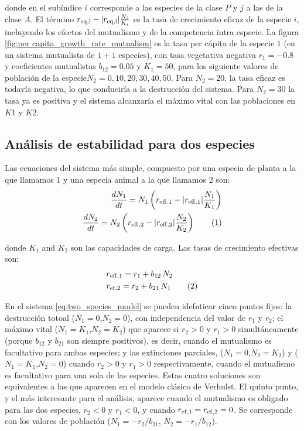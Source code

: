 \noindent donde en el subíndice $i$ corresponde a las especies de la clase $P$ y $j$ a las de la clase $A$. El término $r_{\rm{eq},i} - |r_{\rm{eq},i}| \frac{N_i}{K_i}$ es la tasa de crecimiento eficaz de la especie $i$, incluyendo los efectos del mutualismo y de la competencia intra especie. La figura \ref{fig:per capita_growth_rate_mutualism} es la tasa per cápita de la especie $1$ (en un sistema mutualista de $1+1$ especies),
con tasa vegetativa negativa $r_1=-0.8$ y coeficientes mutualistas $b_{12}=0.05$ y $K_1=50$, para los siguiente valores de población de la especie$N_2=0,10,20,30,40,50$. Para $N_2=20$, la tasa eficaz es todavía negativa, lo que conduciría a la destrucción del sistema. Para
$N_2=30$ la tasa ya es positiva y el sistema alcanzaría el máximo vital con las poblaciones en $K1$ y $K2$.

\subsection{Análisis de estabilidad para dos especies}

Las ecuaciones del sistema más simple, compuesto por una especia de planta a la que llamamos $1$ y una especia animal a la que llamamos $2$ son:
\begin{align*}
\displaystyle \frac{dN_1}{dt}= N_1 \left( r_{\rm{eff},1} - |r_{\rm{eff},1}| \frac{N_1}{K_1} \right) \\
\displaystyle \frac{dN_2}{dt}= N_2 \left( r_{\rm{eff},2} - |r_{\rm{eff},2}| \frac{N_2}{K_2} \right)
\stepcounter{equation}\tag{\theequation}\label{eq:two_species_model}
\end{align*}

\noindent donde $K_1$ and $K_2$ son las capacidades de carga. Las tasas de crecimiento efectivas son:
\begin{align*}
\displaystyle &r_{\rm{eff},1} = r_{1} + b_{12}\, N_2 \\
\displaystyle &r_{\rm{ef},2} = r_{2} + b_{21}\, N_1
\stepcounter{equation}\tag{\theequation}\label{eq:two_species_reff}
\end{align*}

En el sistema \ref{eq:two_species_model} se pueden idefnticar cinco puntos fijos:
la destrucción totoal ($N_1=0$,$N_2=0$), con independencia del valor de $r_{1}$ y $r_{2}$;
el máximo vital ($N_1=K_1$,$N_2=K_2$) que aparece si $r_{2}>0$ y $r_{1}>0$ simultáneamente (porque $b_{12}$ y $b_{21}$ son siempre positivos), es decir, cuando el mutualismo es facultativo para ambas especies; y las extinciones parciales, ($N_1=0$,$N_2=K_2$)
y ($N_1=K_1$,$N_2=0$) cuando $r_{2}>0$ y $r_{1}>0$ respectivamente, cuando el mutualismo es facultativo para una sola de las especies. Estas cuatro soluciones son equivalentes a las que aparecen en el modelo clásico de Verhulst. El quinto punto, y el más interesante para el análisis, aparece cuando el mutualismo es obligado para las dos especies, $r_{2}<0$ y $r_{1}<0$, y cuando $r_{\rm{ef},1}=r_{\rm{ef},2}=0$. Se corresponde con los valores de población ($N_1={-r_{2}}/{b_{21}}$, $N_2={-r_{1}}/{b_{12}}$).

